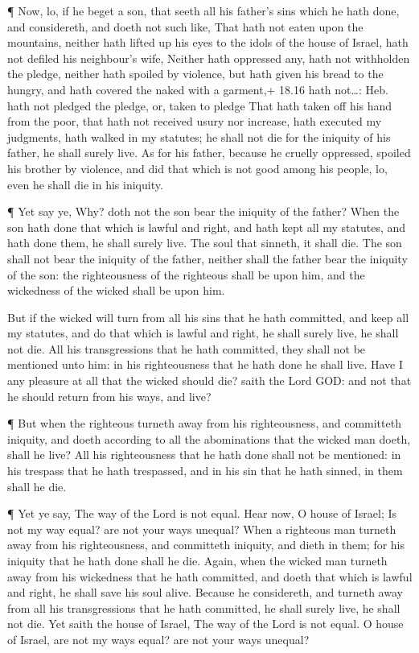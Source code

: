  ¶ Now, lo, if he beget a son, that seeth all his father's
sins which he hath done, and considereth, and doeth not such like,
 That hath not eaten upon the mountains, neither hath
lifted up his eyes to the idols of the house of Israel, hath not defiled
his neighbour's wife,  Neither hath oppressed any, hath not
withholden the pledge, neither hath spoiled by violence, but hath given
his bread to the hungry, and hath covered the naked with a garment,+
18.16 hath not\ldots: Heb. hath not pledged the pledge, or, taken to
pledge  That hath taken off his hand from the poor, that
hath not received usury nor increase, hath executed my judgments, hath
walked in my statutes; he shall not die for the iniquity of his father,
he shall surely live.  As for his father, because he
cruelly oppressed, spoiled his brother by violence, and did that which
is not good among his people, lo, even he shall die in his iniquity.

 ¶ Yet say ye, Why? doth not the son bear the iniquity of
the father? When the son hath done that which is lawful and right, and
hath kept all my statutes, and hath done them, he shall surely live.
 The soul that sinneth, it shall die. The son shall not
bear the iniquity of the father, neither shall the father bear the
iniquity of the son: the righteousness of the righteous shall be upon
him, and the wickedness of the wicked shall be upon him.

 But if the wicked will turn from all his sins that he hath
committed, and keep all my statutes, and do that which is lawful and
right, he shall surely live, he shall not die.  All his
transgressions that he hath committed, they shall not be mentioned unto
him: in his righteousness that he hath done he shall live. 
Have I any pleasure at all that the wicked should die? saith the Lord
GOD: and not that he should return from his ways, and live?

 ¶ But when the righteous turneth away from his
righteousness, and committeth iniquity, and doeth according to all the
abominations that the wicked man doeth, shall he live? All his
righteousness that he hath done shall not be mentioned: in his trespass
that he hath trespassed, and in his sin that he hath sinned, in them
shall he die.

 ¶ Yet ye say, The way of the Lord is not equal. Hear now,
O house of Israel; Is not my way equal? are not your ways unequal?
 When a righteous man turneth away from his righteousness,
and committeth iniquity, and dieth in them; for his iniquity that he
hath done shall he die.  Again, when the wicked man turneth
away from his wickedness that he hath committed, and doeth that which is
lawful and right, he shall save his soul alive.  Because he
considereth, and turneth away from all his transgressions that he hath
committed, he shall surely live, he shall not die.  Yet
saith the house of Israel, The way of the Lord is not equal. O house of
Israel, are not my ways equal? are not your ways unequal?


